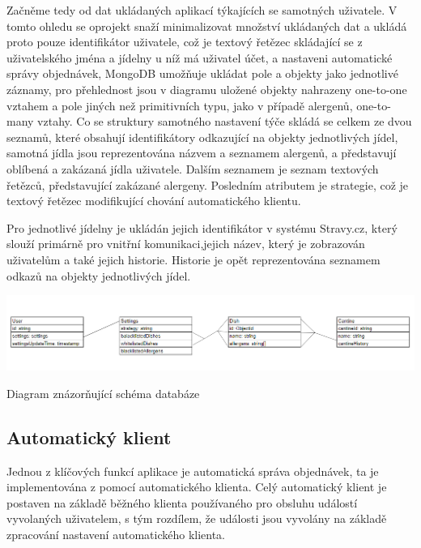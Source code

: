 \documentclass[12pt]{article}
\begin{document}
Začněme tedy od dat ukládaných aplikací týkajících se samotných uživatele. V tomto ohledu se oprojekt snaží minimalizovat množství ukládaných dat a ukládá proto pouze identifikátor uživatele, což je textový řetězec skládající se z uživatelského jména a jídelny u níž má uživatel účet, a nastaveni automatické správy objednávek, MongoDB umožňuje ukládat pole a objekty jako jednotlivé záznamy, pro přehlednost jsou v diagramu uložené objekty nahrazeny one-to-one vztahem a pole jiných než primitivních typu, jako v případě alergenů, one-to-many vztahy. Co se struktury samotného nastavení týče skládá se celkem ze dvou seznamů, které obsahují identifikátory odkazující na objekty jednotlivých jídel, samotná jídla jsou reprezentována názvem a seznamem alergenů, a představují oblíbená a zakázaná jídla uživatele. Dalším seznamem je seznam textových řetězců, představující zakázané alergeny. Posledním atributem je strategie, což je textový řetězec modifikující chování automatického klientu.

Pro jednotlivé jídelny je ukládán jejich identifikátor v systému Stravy.cz, který slouží primárně pro vnitřní komunikaci,jejich název, který je zobrazován uživatelům a také jejich historie. Historie je opět reprezentována seznamem odkazů na  objekty jednotlivých jídel. 

\begin{listing}[!ht]
\includegraphics[scale=0.75, width=15cm]{pictures/schema.png}\par
\caption{Diagram znázorňující schéma databáze}
\end{listing}

\subsection{Automatický klient}
Jednou z klíčových funkcí aplikace je automatická správa objednávek, ta je implementována z pomocí automatického klienta. Celý automatický klient je postaven na základě běžného klienta používaného pro obsluhu událostí vyvolaných uživatelem, s tým rozdílem, že události jsou vyvolány na základě zpracování nastavení automatického klienta.
\end{document}

